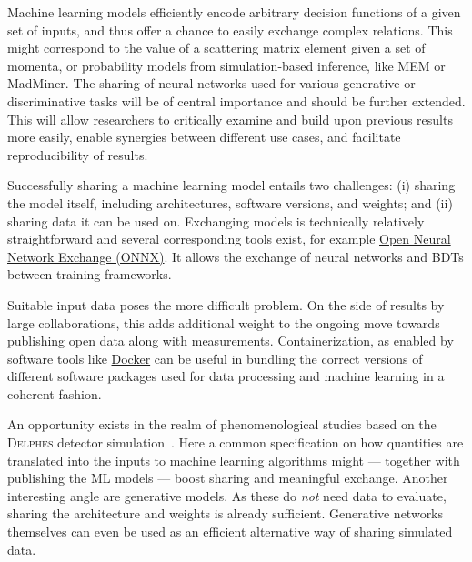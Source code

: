 \documentclass[submission,Phys]{SciPost}
\begin{document}
Machine learning models efficiently encode arbitrary decision functions of a given set of inputs, and thus offer a chance to easily exchange complex relations. This might correspond to the value of a scattering matrix element given a set of momenta, or probability models from simulation-based inference, like MEM or MadMiner. The sharing of neural networks used for various generative or discriminative tasks will be of central importance and should be further extended. This will allow researchers to critically examine and build upon previous results more easily, enable synergies between different use cases, and facilitate reproducibility of results.

Successfully sharing a machine learning model entails two challenges: (i) sharing the model itself, including architectures, software versions, and weights; and (ii) sharing data it can be used on. Exchanging models is technically relatively straightforward and several corresponding tools exist, for example \href{https://github.com/onnx}{Open Neural Network Exchange (ONNX)}. It allows the exchange of neural networks and BDTs between training frameworks. 

Suitable input data poses the more difficult problem. On the side of results by large collaborations, this adds additional weight to the ongoing move towards publishing open data along with  measurements. Containerization, as enabled by software tools like \href{https://www.docker.com/}{Docker} can be useful in bundling the correct versions of different software packages used for data processing and machine learning in a coherent fashion.

An opportunity exists in the realm of phenomenological studies based on the \textsc{Delphes} detector simulation~\cite{deFavereau:2013fsa}. Here a common specification on how quantities are translated into the inputs to machine learning algorithms might --- together with publishing the ML models --- boost sharing and meaningful exchange. Another interesting angle are generative models. As these do \emph{not} need data to evaluate, sharing the architecture and weights is already sufficient. Generative networks themselves can even be used as an efficient alternative way of sharing simulated data.
\end{document}
